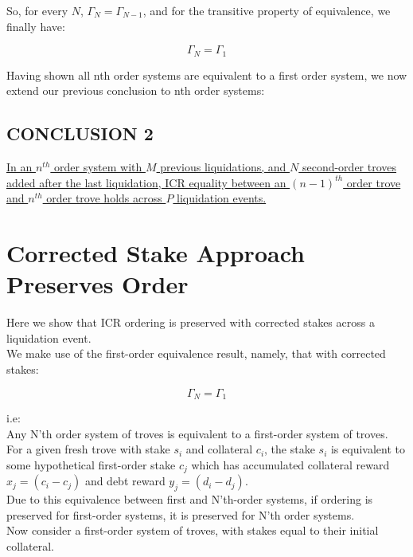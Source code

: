 \documentclass[reqno]{article}
\begin{document}
\bigskip
So, for every $N$, $\Gamma_N = \Gamma_{N-1}$, and for the transitive property of equivalence, we finally have:

\begin{equation}
    \Gamma_N=\Gamma_1
\end{equation}

\bigskip
Having shown all nth order systems are equivalent to a first order system, we now extend our previous conclusion to nth order systems:

\subsection{CONCLUSION 2}

\uline{In an $n^{th}$ order system with $M$ previous liquidations, and $N$ second-order troves added after the last liquidation, ICR equality between an $(n-1)^{th}$ order trove and $n^{th}$ order trove holds across $P$ liquidation events.}

\section{Corrected Stake Approach Preserves Order}
Here we show that ICR ordering is preserved with corrected stakes across a liquidation event.\\

We make use of the first-order equivalence result, namely, that with corrected stakes:

\begin{equation} 
    \Gamma_N = \Gamma_1
\end{equation}

i.e:\\

Any N’th order system of troves is equivalent to a first-order system of troves. For a given fresh trove with stake $s_i$ and collateral $c_i$, the stake $s_i$ is equivalent to some hypothetical first-order stake $c_j$ which has accumulated collateral reward $x_j = (c_i - c_j)$ and debt reward $y_j = (d_i - d_j)$.\\

Due to this equivalence between first and N’th-order systems, if ordering is preserved for first-order systems, it is preserved for N’th order systems.\\

Now consider a first-order system of troves, with stakes equal to their initial collateral.\\
\end{document}
